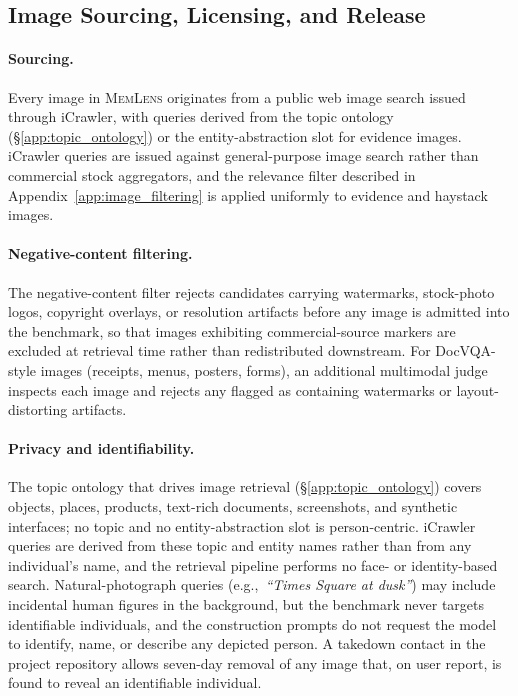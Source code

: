 \documentclass{llmxive}
\providecommand{\bench}{\textsc{MemLens}}
\begin{document}
\subsection{Image Sourcing, Licensing, and Release}
\label{app:image_release}

\paragraph{Sourcing.}
Every image in \bench{} originates from a public web image search issued through iCrawler, with queries derived from the topic ontology (\S\ref{app:topic_ontology}) or the entity-abstraction slot for evidence images. iCrawler queries are issued against general-purpose image search rather than commercial stock aggregators, and the relevance filter described in Appendix~\ref{app:image_filtering} is applied uniformly to evidence and haystack images.

\paragraph{Negative-content filtering.}
The negative-content filter rejects candidates carrying watermarks, stock-photo logos, copyright overlays, or resolution artifacts before any image is admitted into the benchmark, so that images exhibiting commercial-source markers are excluded at retrieval time rather than redistributed downstream. For DocVQA-style images (receipts, menus, posters, forms), an additional multimodal judge~\cite{openai2023gpt4v} inspects each image and rejects any flagged as containing watermarks or layout-distorting artifacts.

\paragraph{Privacy and identifiability.}
The topic ontology that drives image retrieval (\S\ref{app:topic_ontology}) covers objects, places, products, text-rich documents, screenshots, and synthetic interfaces; no topic and no entity-abstraction slot is person-centric. iCrawler queries are derived from these topic and entity names rather than from any individual's name, and the retrieval pipeline performs no face- or identity-based search. Natural-photograph queries (e.g.,~\textit{``Times Square at dusk''}) may include incidental human figures in the background, but the benchmark never targets identifiable individuals, and the construction prompts do not request the model to identify, name, or describe any depicted person. A takedown contact in the project repository allows seven-day removal of any image that, on user report, is found to reveal an identifiable individual.
\end{document}
